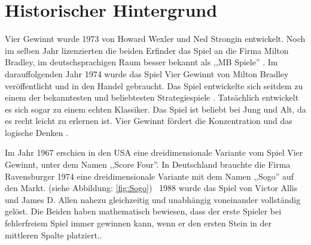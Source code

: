 \section{Historischer Hintergrund}

Vier Gewinnt wurde 1973 von Howard Wexler und Ned Strongin entwickelt. Noch im selben Jahr lizenzierten die beiden Erfinder das Spiel an die Firma Milton Bradley, im deutschsprachigen Raum besser bekannt als ,,MB Spiele''
\autocite{gameorama_4gewinnt}\autocite{wikipedia_vier_gewinnt}.
Im darauffolgenden Jahr 1974 wurde das Spiel Vier Gewinnt von Milton Bradley veröffentlicht und in den Handel gebraucht. Das Spiel entwickelte sich seitdem zu einem der bekanntesten und beliebtesten Strategiespiele \autocite{wikipedia_vier_gewinnt}. Tatsächlich entwickelt es sich sogar zu einem echten Klassiker. Das Spiel ist beliebt bei Jung und Alt, da es recht leicht zu erlernen ist. Vier Gewinnt fördert die Konzentration und das logische Denken \autocite{50plus_vier_gewinnt}.

\newpage

Im Jahr 1967 erschien in den USA eine dreidimensionale Variante vom Spiel Vier Gewinnt, unter dem Namen ,,Score Four''. In Deutschland brauchte die Firma Ravensburger 1974 eine dreidimensionale Variante mit dem Namen ,,Sogo'' auf den Markt. (siehe Abbildung: \ref{fig:Sogo}) \
1988 wurde das Spiel von Victor Allis und James D. Allen nahezu gleichzeitig und unabhängig voneinander vollständig gelöst. Die Beiden haben mathematisch bewiesen, dass der erste Spieler bei fehlerfreiem Spiel immer gewinnen kann, wenn er den ersten Stein in der mittleren Spalte platziert.\autocite{wikipedia_vier_gewinnt}.\\
 
